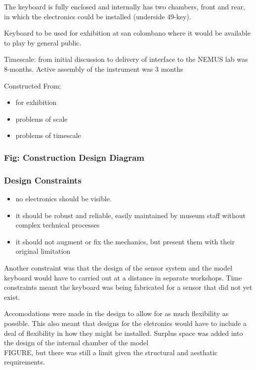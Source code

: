 The keyboard is fully enclosed and internally has two chambers, front
and rear, in which the electronics could be installed \figure(underside
49-key).

Keyboard to be used for exhibition at san colombano where it would be
available to play by general public.

Timescale: from initial discussion to delivery of interface to the NEMUS
lab was 8-months. Active assembly of the instrument was 3 months

Constructed From:

\begin{itemize}
\tightlist
\item
  for exhibition
\item
  problems of scale
\item
  problems of timescale
\end{itemize}

\subsubsection{Fig: Construction Design
Diagram}\label{fig-construction-design-diagram-1}

\subsubsection{Design Constraints}\label{design-constraints}

\begin{itemize}
\tightlist
\item
  no electronics should be visible.
\item
  it should be robust and reliable, easily maintained by museum staff
  without complex technical processes
\item
  it should not augment or fix the mechanics, but present them with
  their original limitation
\end{itemize}

Another constraint was that the design of the sensor system and the
model keyboard would have to carried out at a distance in separate
workshops. Time constraints meant the keyboard was being fabricated for
a sensor that did not yet exist.

Accomodations were made in the design to allow for as much flexibility
as possible. This also meant that designs for the eletronics would have
to include a deal of flexibility in how they might be installed. Surplus
space was added into the design of the internal chamber of the model
\\FIGURE, but there was still a limit given the structural and aesthatic
requirements.

